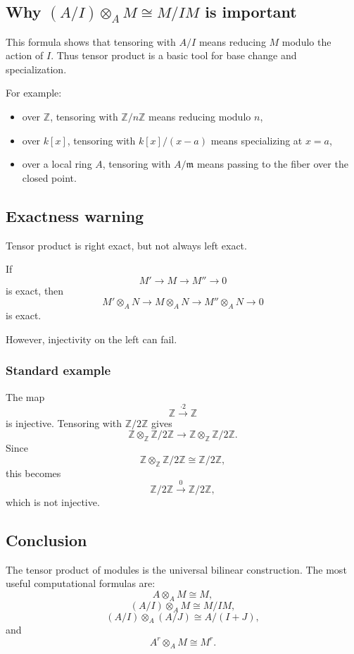 \documentclass[12pt,a4paper]{article}
\theoremstyle{notespace}
\begin{document}
\subsection{Why \((A/I)\otimes_A M\cong M/IM\) is important}

This formula shows that tensoring with \(A/I\) means reducing \(M\) modulo the action of \(I\). Thus tensor product is a basic tool for base change and specialization.

For example:

\begin{itemize}
	\item over \(\mathbb Z\), tensoring with \(\mathbb Z/n\mathbb Z\) means reducing modulo \(n\),
	\item over \(k[x]\), tensoring with \(k[x]/(x-a)\) means specializing at \(x=a\),
	\item over a local ring \(A\), tensoring with \(A/\mathfrak m\) means passing to the fiber over the closed point.
\end{itemize}

\subsection{Exactness warning}

Tensor product is right exact, but not always left exact.

If
\[
M'\to M\to M''\to 0
\]
is exact, then
\[
M'\otimes_A N \to M\otimes_A N \to M''\otimes_A N \to 0
\]
is exact.

However, injectivity on the left can fail.

\subsubsection*{Standard example}

The map
\[
\mathbb Z\xrightarrow{\cdot 2}\mathbb Z
\]
is injective. Tensoring with \(\mathbb Z/2\mathbb Z\) gives
\[
\mathbb Z\otimes_{\mathbb Z}\mathbb Z/2\mathbb Z
\longrightarrow
\mathbb Z\otimes_{\mathbb Z}\mathbb Z/2\mathbb Z.
\]
Since
\[
\mathbb Z\otimes_{\mathbb Z}\mathbb Z/2\mathbb Z\cong \mathbb Z/2\mathbb Z,
\]
this becomes
\[
\mathbb Z/2\mathbb Z \xrightarrow{0} \mathbb Z/2\mathbb Z,
\]
which is not injective.

\subsection{Conclusion}

The tensor product of modules is the universal bilinear construction. The most useful computational formulas are:
\[
A\otimes_A M\cong M,
\]
\[
(A/I)\otimes_A M\cong M/IM,
\]
\[
(A/I)\otimes_A (A/J)\cong A/(I+J),
\]
and
\[
A^r\otimes_A M\cong M^r.
\]
\end{document}
